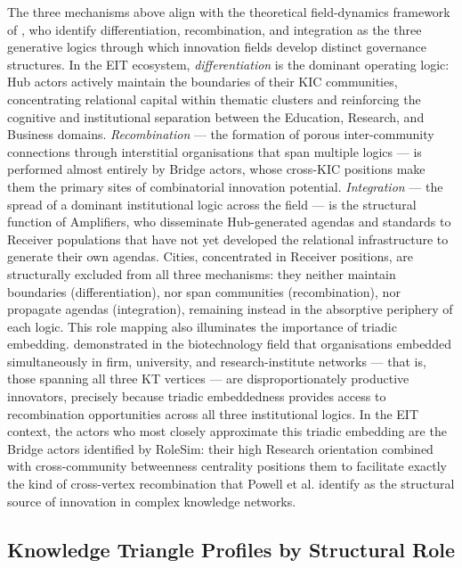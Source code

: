 \documentclass[review,12pt]{elsarticle}
\begin{document}
The three mechanisms above align with the theoretical field-dynamics framework of \citet{korff2015social}, who identify differentiation, recombination, and integration as the three generative logics through which innovation fields develop distinct governance structures. In the EIT ecosystem, \emph{differentiation} is the dominant operating logic: Hub actors actively maintain the boundaries of their KIC communities, concentrating relational capital within thematic clusters and reinforcing the cognitive and institutional separation between the Education, Research, and Business domains. \emph{Recombination} --- the formation of porous inter-community connections through interstitial organisations that span multiple logics --- is performed almost entirely by Bridge actors, whose cross-KIC positions make them the primary sites of combinatorial innovation potential. \emph{Integration} --- the spread of a dominant institutional logic across the field --- is the structural function of Amplifiers, who disseminate Hub-generated agendas and standards to Receiver populations that have not yet developed the relational infrastructure to generate their own agendas. Cities, concentrated in Receiver positions, are structurally excluded from all three mechanisms: they neither maintain boundaries (differentiation), nor span communities (recombination), nor propagate agendas (integration), remaining instead in the absorptive periphery of each logic. This role mapping also illuminates the importance of triadic embedding. \citet{powell1996interorganizational} demonstrated in the biotechnology field that organisations embedded simultaneously in firm, university, and research-institute networks --- that is, those spanning all three KT vertices --- are disproportionately productive innovators, precisely because triadic embeddedness provides access to recombination opportunities across all three institutional logics. In the EIT context, the actors who most closely approximate this triadic embedding are the Bridge actors identified by RoleSim: their high Research orientation combined with cross-community betweenness centrality positions them to facilitate exactly the kind of cross-vertex recombination that Powell et al. identify as the structural source of innovation in complex knowledge networks.

\subsection{Knowledge Triangle Profiles by Structural Role}
\end{document}

